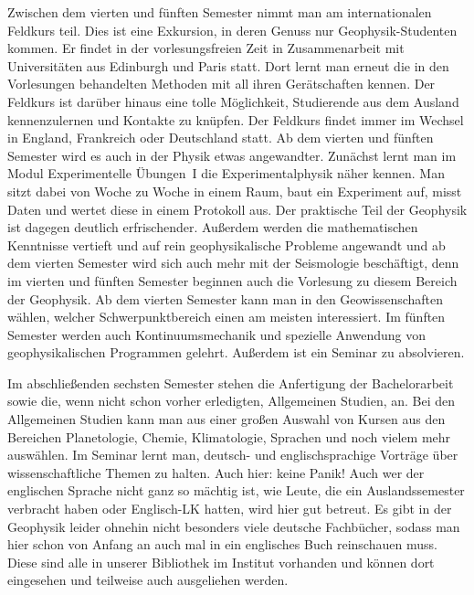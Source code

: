 \begin{multicols}{2}
Zwischen dem vierten und fünften Semester nimmt man am internationalen Feldkurs teil.
Dies ist eine Exkursion, in deren Genuss nur Geophysik-Studenten kommen.
Er findet in der vorlesungsfreien Zeit in Zusammenarbeit mit Universitäten aus Edinburgh und Paris statt.
Dort lernt man erneut die in den Vorlesungen behandelten Methoden mit all ihren Gerätschaften kennen.
Der Feldkurs ist darüber hinaus eine tolle Möglichkeit, Studierende aus dem Ausland kennenzulernen und Kontakte zu knüpfen.
Der Feldkurs findet immer im Wechsel in England, Frankreich oder Deutschland statt.
Ab dem vierten und fünften Semester wird es auch in der Physik etwas angewandter.
Zunächst lernt man im Modul Experimentelle Übungen~I die Experimentalphysik näher kennen.
Man sitzt dabei von Woche zu Woche in einem Raum, baut ein Experiment auf, misst Daten und wertet diese in einem Protokoll aus.
Der praktische Teil der Geophysik ist dagegen deutlich erfrischender.
Außerdem werden die mathematischen Kenntnisse vertieft und auf rein geophysikalische Probleme angewandt und ab dem vierten Semester wird sich auch mehr mit der Seismologie beschäftigt, denn im vierten und fünften Semester beginnen auch die Vorlesung zu diesem Bereich der Geophysik.
Ab dem vierten Semester kann man in den Geowissenschaften wählen, welcher Schwerpunktbereich einen am meisten interessiert. 
Im fünften Semester werden auch Kontinuumsmechanik und spezielle Anwendung von geophysikalischen Programmen gelehrt. Außerdem ist ein Seminar zu absolvieren.

Im abschließenden sechsten Semester stehen die Anfertigung der Bachelorarbeit sowie die, wenn nicht schon vorher erledigten, Allgemeinen Studien, an. Bei den Allgemeinen Studien kann man aus einer großen Auswahl von Kursen aus den Bereichen Planetologie, Chemie, Klimatologie, Sprachen und noch vielem mehr auswählen. Im Seminar lernt man, deutsch- und englischsprachige Vorträge über wissenschaftliche Themen zu halten. Auch hier: keine Panik! Auch wer der englischen Sprache nicht ganz so mächtig ist, wie Leute, die ein Auslandssemester verbracht haben oder Englisch-LK hatten, wird hier gut betreut. Es gibt in der Geophysik leider ohnehin nicht besonders viele deutsche Fachbücher, sodass man hier schon von Anfang an auch mal in ein englisches Buch reinschauen muss. Diese sind alle in unserer Bibliothek im Institut vorhanden und können dort eingesehen und teilweise auch ausgeliehen werden.



\end{multicols}
